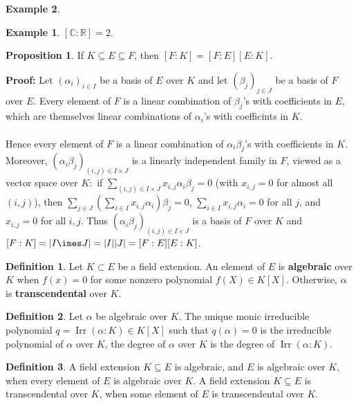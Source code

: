 \documentclass[11pt]{amsbook}%
\theoremstyle{plain}
\theoremstyle{definition}
\newtheorem{definition*}{Definition}
\newtheorem*{example*}{Example}
\newtheorem{proposition}[theorem]{Proposition}
\numberwithin{equation}{section}
\newcommand{\CC}{\mathbb C}
\newcommand{\RR}{\mathbb R}
\renewcommand{\proof}{ \textbf{Proof: }}
\DeclareMathOperator{\Irr}{Irr}
\begin{document}
\begin{example*}
\begin{example*}
  $[\CC:\RR] = 2$.
\end{example*}

\begin{proposition}
  If $K \subseteq E \subseteq F$, then $[F:K] = [F:E][E:K]$.
\end{proposition} \vspace{1.8em}
\proof Let $(\alpha_{i})_{i \in I}$ be a basis of $E$ over $K$ and let
$(\beta_{j})_{j \in J}$ be a basis of $F$ over $E$. Every element
of $F$ is a linear combination of $\beta_{j}$'s with coefficients
in $E$, which are themselves linear combinations of $\alpha_{i}$'s with
coefficints in $K$. \\ \\
Hence every element of $F$ is a linear combination of $\alpha_{i} \beta_{j}$'s with
coefficients  in $K$. Moreover, $(\alpha_{i} \beta_{j})_{(i, j) \in I \times J}$
is a linearly independent family in $F$, viewed as a vector space over $K:$ if
$\sum_{(i, j) \in I \times J} x_{i, j}\alpha_{i}\beta_{j} = 0$  (with $x_{i, j} = 0$
for almost all $(i, j)$), then $\sum_{j \in J} \left( \sum_{i \in I} x_{i, j}\alpha_{i} \right) \beta_{j} = 0$,
$\sum_{i \in I} x_{i, j}\alpha_{i} = 0$ for all $j$, and $x_{i, j} = 0$ for all
$i, j$. Thus $(\alpha_{i}\beta_{j})_{(i, j) \in I \times J}$ is a basis
of $F$ over $K$ and $[F:K] = |I \imes J| = |I||J| = [F:E][E:K]$. \qedsymbol

\begin{definition*}
  Let $K \subset E$ be a field extension. An element of $E$ is \textbf{algebraic}
  over $K$ when $f(x) = 0$ for some nonzero polynomial $f(X) \in K[X]$. Otherwise,
  $\alpha$ is \textbf{transcendental} over $K$.
\end{definition*}


\begin{definition*}
  Let $\alpha$ be algebraic over $K$. The unique monic irreducible polynomial
  $q = \Irr(\alpha:K) \in K[X]$ such that $q(\alpha) = 0$ is the
  irreducible polynomial of $\alpha$ over $K$, the degree of $\alpha$
  over $K$ is the degree of $\Irr(\alpha:K)$.
\end{definition*}
  
\begin{definition*}
  A field extension $K \subseteq E$ is algebraic, and $E$ is algebraic over
  $K$, when every element of $E$ is algebraic over $K$. A field extension
  $K \subseteq E$ is transcendental over $K$, when some element of $E$
  is transcendental over $K$.
\end{definition*}


\end{example*}
\end{document}
